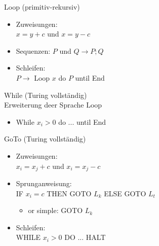 \begin{minipage}{0.5\linewidth}
    \begin{KR}{Loop (primitiv-rekursiv)}
        \begin{itemize}
            \item Zuweisungen:\\ $x = y + c$ und $x = y - c$
            \item Sequenzen: $P$ und $Q \rightarrow P; Q$
            \item Schleifen:\\ $P \rightarrow$ Loop $x$ do $P$ until End
        \end{itemize}
    \end{KR}
    \begin{KR}{While (Turing vollständig)}\\
        Erweiterung deer Sprache Loop
        \begin{itemize}
            \item While $x_i > 0$ do ... until End
        \end{itemize}
    \end{KR}
\end{minipage}
\begin{minipage}{0.5\linewidth}
    \begin{KR}{GoTo (Turing vollständig)}
        \begin{itemize}
            \item Zuweisungen:\\ $x_i = x_j + c$ und $x_i = x_j - c$
            \item Sprunganweisung:\\ IF $x_i = c$ THEN GOTO $L_k$ ELSE GOTO $L_t$
            \begin{itemize}
                \item or simple: GOTO $L_k$
            \end{itemize}
            \item Schleifen:\\ WHILE $x_i > 0$ DO ... HALT
        \end{itemize}
        \vspace{3mm}
    \end{KR}
\end{minipage}
\raggedcolumns